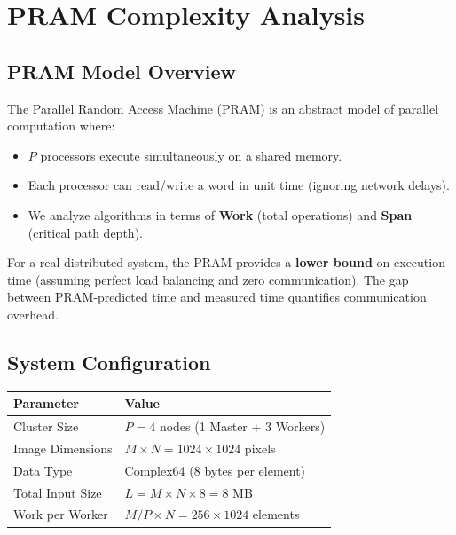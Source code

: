 \documentclass[11pt,a4paper]{article}
\begin{document}
\section{PRAM Complexity Analysis}

\subsection{PRAM Model Overview}

The Parallel Random Access Machine (PRAM) is an abstract model of parallel computation where:
\begin{itemize}
    \item $P$ processors execute simultaneously on a shared memory.
    \item Each processor can read/write a word in unit time (ignoring network delays).
    \item We analyze algorithms in terms of \textbf{Work} (total operations) and \textbf{Span} (critical path depth).
\end{itemize}

For a real distributed system, the PRAM provides a \textbf{lower bound} on execution time (assuming perfect load balancing and zero communication). The gap between PRAM-predicted time and measured time quantifies communication overhead.

\subsection{System Configuration}

\begin{table}[h]
    \centering
    \begin{tabular}{ll}
        \hline
        \textbf{Parameter} & \textbf{Value} \\
        \hline
        Cluster Size & $P = 4$ nodes (1 Master + 3 Workers) \\
        Image Dimensions & $M \times N = 1024 \times 1024$ pixels \\
        Data Type & Complex64 (8 bytes per element) \\
        Total Input Size & $L = M \times N \times 8 = 8\text{ MB}$ \\
        Work per Worker & $M/P \times N = 256 \times 1024$ elements \\
        \hline
    \end{tabular}
\end{table}
\end{document}
